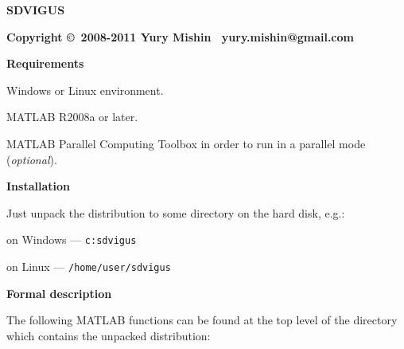 \documentclass[a4paper,onesided,12pt]{letter}
\begin{document}
\begin{center}
{\LARGE\bfseries\sffamily
SDVIGUS }

{\bfseries\sffamily
Copyright \copyright\ 2008-2011 Yury Mishin \textbar\ yury.mishin@gmail.com}
\end{center}

\makebox[\textwidth]{
\rule{1.05\linewidth}{0.35mm}}

\begin{list}{}{\leftmargin=1em}

\item \textbf{Requirements}

\begin{list}{}{\leftmargin=1em}

\item Windows or Linux environment.

\item MATLAB R2008a or later.

\item MATLAB Parallel Computing Toolbox in order to run in a parallel mode (\textsl{optional}).


\end{list}

\item \textbf{Installation}

Just unpack the distribution to some directory on the hard disk, e.g.:

on Windows --- \texttt{c:sdvigus}

on Linux --- \texttt{/home/user/sdvigus}

\item \textbf{Formal description}

The following MATLAB functions can be found at the top level of the directory which contains the unpacked distribution:


\end{list}
\end{document}
